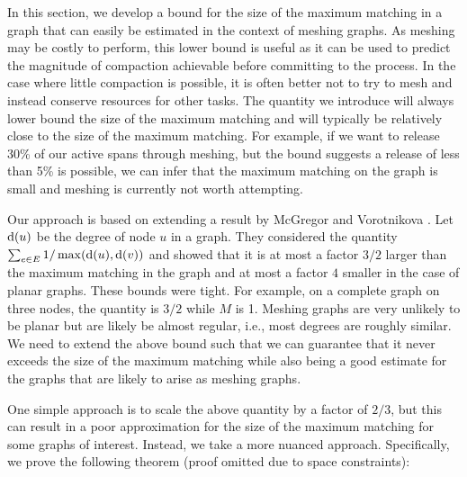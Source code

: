 In this section, we develop a bound for the size of the maximum matching in a graph that can easily be estimated in the context of meshing graphs.  As meshing may be costly to perform, this lower bound is useful as it can be used to predict the magnitude of compaction achievable before committing to the process.  In the case where little compaction is possible, it is often better not to try to mesh and instead conserve resources for other tasks. The quantity we introduce will always lower bound the size of  the maximum matching and will typically be relatively close to the size of the maximum matching.  For example, if we want to release 30\% of our active spans through meshing, but the bound suggests a release of less than 5\% is possible, we can infer that the maximum matching on the graph is small and meshing is currently not worth attempting.

Our approach is based on extending a result by McGregor and Vorotnikova \cite{McGregorV16}. Let $\textup{d}(u)$ be the degree of node $u$ in a graph. They considered the quantity
$\sum_{e\in E} 1/\max(\textup{d}(u),\textup{d}(v))$
and showed that it is at most a factor $3/2$ larger than the maximum matching in the graph and at most a factor $4$ smaller in the case of planar graphs. These bounds were tight.  For example, on a complete graph on three nodes, the quantity is $3/2$ while $M$ is 1. Meshing graphs are very unlikely to be planar but are likely be almost regular, i.e., most degrees are roughly similar.
We need to extend the above bound such that we can guarantee that it never exceeds the size of the maximum matching while also being a good estimate for the graphs that are likely to arise as meshing graphs.



One simple approach is to scale the above quantity by a factor of $2/3$,
but this can result in a poor approximation for the size of the
maximum matching for some graphs of interest. Instead, we take a more
nuanced approach. Specifically, we prove the following theorem (proof omitted
due to space constraints):

